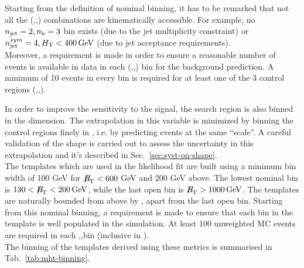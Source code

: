 Starting from the definition of nominal binning, it has to be remarked that not all the (\njet,\nb,\scalht) combinations 
are kinematically accessible. For example, no $n_{\text{jet}}=2,n_{\text{b}}=3$ bin exists (due to the jet multiplicity constraint) 
or $n_{\text{jet}}^{sym}=4,\mbox{$H_\text{T}$}<400\,\mathrm{GeV}$ (due to jet acceptance requirements). \\
Moreover, a requirement is made in order to ensure a reasonable number of events is available in data 
in each (\njet,\nb,\scalht) bin for the background prediction. 
A minimum of 10 events in every bin is required for at least one of the 3 control regions (\mj,\mmj,\gj). 

In order to improve the sensitivity to the signal, the search region is also binned in the \MHT dimension. 
The extrapolation in this variable is minimized by binning the control regions finely in \scalht, i.e. by predicting 
events at the same ``scale''. A careful validation of the \MHT shape is carried out to assess 
the uncertainty in this extrapolation and it's described in Sec.~\ref{sec:syst-on-shape}. \\
The \MHT templates which are used in the likelihood fit are built using a minimum bin width of 
100 GeV for $\MHT<600$ GeV and 200 GeV above. The lowest nominal bin is $130<\MHT<200\,\mathrm{GeV}$, 
while the last open bin is $\MHT>1000\,\mathrm{GeV}$. 
The \MHT templates are naturally bounded from above by \scalht, apart from the last open \scalht bin. 
Starting from this nominal binning, a requirement is made to ensure that each bin in the template is well populated in the simulation. 
At least 100 unweighted MC events are required in each \njet,\scalht,\MHT bin (inclusive in \nb). \\
The binning of the \MHT templates derived using these metrics is summarised in Tab.~\ref{tab:mht-binning}.


